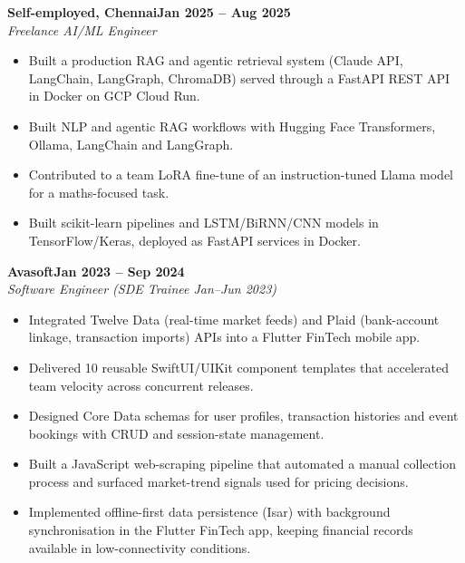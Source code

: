\documentclass[a4paper,11pt]{article}
\newcommand{\entry}[4]{\needspace{4\baselineskip}\noindent\textbf{#1}\hfill\textbf{#2}\\ \textit{#3}\hfill\textit{#4}\par}
\begin{document}
\vspace{4pt}
\entry{Self-employed, Chennai}{Jan 2025 – Aug 2025}{Freelance AI/ML Engineer}{}
\begin{itemize}
  \item Built a production RAG and agentic retrieval system (Claude API, LangChain, LangGraph, ChromaDB) served through a FastAPI REST API in Docker on GCP Cloud Run.
  \item Built NLP and agentic RAG workflows with Hugging Face Transformers, Ollama, LangChain and LangGraph.
  \item Contributed to a team LoRA fine-tune of an instruction-tuned Llama model for a maths-focused task.
  \item Built scikit-learn pipelines and LSTM/BiRNN/CNN models in TensorFlow/Keras, deployed as FastAPI services in Docker.
\end{itemize}
\vspace{4pt}
\entry{Avasoft}{Jan 2023 – Sep 2024}{Software Engineer (SDE Trainee Jan–Jun 2023)}{}
\begin{itemize}
  \item Integrated Twelve Data (real-time market feeds) and Plaid (bank-account linkage, transaction imports) APIs into a Flutter FinTech mobile app.
  \item Delivered 10 reusable SwiftUI/UIKit component templates that accelerated team velocity across concurrent releases.
  \item Designed Core Data schemas for user profiles, transaction histories and event bookings with CRUD and session-state management.
  \item Built a JavaScript web-scraping pipeline that automated a manual collection process and surfaced market-trend signals used for pricing decisions.
  \item Implemented offline-first data persistence (Isar) with background synchronisation in the Flutter FinTech app, keeping financial records available in low-connectivity conditions.
\end{itemize}

\end{document}
